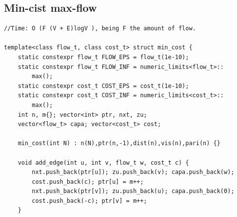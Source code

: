 \documentclass[11pt, a4paper, twoside]{article}
\begin{document}
\subsection{Min-cist max-flow}
\begin{verbatim}
//Time: O (F (V + E)logV ), being F the amount of flow.

template<class flow_t, class cost_t> struct min_cost {
    static constexpr flow_t FLOW_EPS = flow_t(1e-10);
    static constexpr flow_t FLOW_INF = numeric_limits<flow_t>::
        max();
    static constexpr cost_t COST_EPS = cost_t(1e-10);
    static constexpr cost_t COST_INF = numeric_limits<cost_t>::
        max();
    int n, m{}; vector<int> ptr, nxt, zu;
    vector<flow_t> capa; vector<cost_t> cost;
    
    min_cost(int N) : n(N),ptr(n,-1),dist(n),vis(n),pari(n) {}
    
    void add_edge(int u, int v, flow_t w, cost_t c) {
        nxt.push_back(ptr[u]); zu.push_back(v); capa.push_back(w);
        cost.push_back(c); ptr[u] = m++;
        nxt.push_back(ptr[v]); zu.push_back(u); capa.push_back(0);
        cost.push_back(-c); ptr[v] = m++;
    }
    

\end{verbatim}
\end{document}
